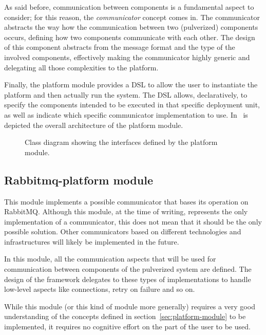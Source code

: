 As said before, communication between components is a fundamental aspect to consider; for this reason, the \emph{communicator} concept comes in.
The communicator abstracts the way how the communication between two (pulverized) components occurs, defining how two components communicate with
each other. The design of this component abstracts from the message format and the type of the involved components, effectively making the
communicator highly generic and delegating all those complexities to the platform.

Finally, the platform module provides a DSL to allow the user to instantiate the platform and then actually run the system.
The DSL allows, declaratively, to specify the components intended to be executed in that specific deployment unit, as well as indicate which
specific communicator implementation to use. In~ is depicted the overall architecture of the platform module.

\begin{figure}
	\centering
	\caption{Class diagram showing the interfaces defined by the platform module.}
	\label{fig:platform-module-architecture}
\end{figure}

\subsection{Rabbitmq-platform module}
\label{sec:rabbitmq-platform-module}

This module implements a possible communicator that bases its operation on RabbitMQ. Although this module, at the time of writing, represents
the only implementation of a communicator, this does not mean that it should be the only possible solution.
Other communicators based on different technologies and infrastructures will likely be implemented in the future.

In this module, all the communication aspects that will be used for communication between components of the pulverized system are defined.
The design of the framework delegates to these types of implementations to handle low-level aspects like connections, retry on failure and so on.

While this module (or this kind of module more generally) requires a very good understanding of the concepts defined in
section~\ref{sec:platform-module} to be implemented, it requires no cognitive effort on the part of the user to be used.

